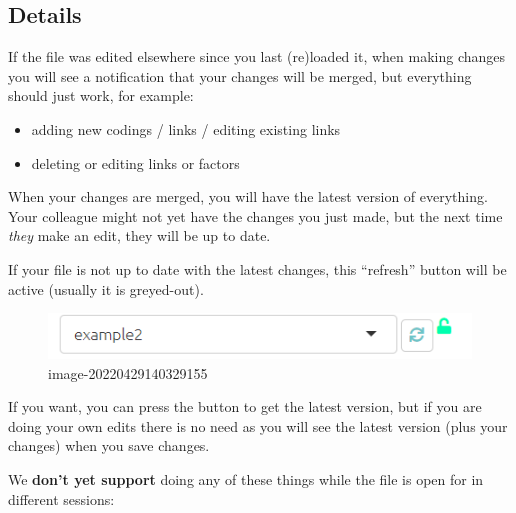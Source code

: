 \documentclass[
]{book}
\providecommand{\tightlist}{%
  \setlength{\itemsep}{0pt}\setlength{\parskip}{0pt}}
\begin{document}
\hypertarget{details}{%
\subsection{Details}\label{details}}

If the file was edited elsewhere since you last (re)loaded it, when making changes you will see a notification that your changes will be merged, but everything should just work, for example:

\begin{itemize}
\tightlist
\item
  adding new codings / links / editing existing links
\item
  deleting or editing links or factors
\end{itemize}

When your changes are merged, you will have the latest version of everything. Your colleague might not yet have the changes you just made, but the next time \emph{they} make an edit, they will be up to date.

If your file is not up to date with the latest changes, this ``refresh'' button will be active (usually it is greyed-out).

\begin{figure}
\centering
\includegraphics{_assets/image-20220429140329155.png}
\caption{image-20220429140329155}
\end{figure}

If you want, you can press the button to get the latest version, but if you are doing your own edits there is no need as you will see the latest version (plus your changes) when you save changes.

We \textbf{don't yet support} doing any of these things while the file is open for in different sessions:
\end{document}
